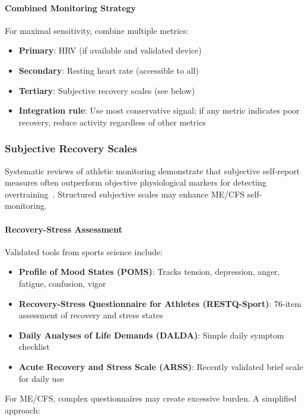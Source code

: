 \paragraph{Combined Monitoring Strategy}

For maximal sensitivity, combine multiple metrics:
\begin{itemize}
    \item \textbf{Primary}: HRV (if available and validated device)
    \item \textbf{Secondary}: Resting heart rate (accessible to all)
    \item \textbf{Tertiary}: Subjective recovery scales (see below)
    \item \textbf{Integration rule}: Use most conservative signal; if any metric indicates poor recovery, reduce activity regardless of other metrics
\end{itemize}

\subsubsection{Subjective Recovery Scales}

Systematic reviews of athletic monitoring demonstrate that subjective self-report measures often outperform objective physiological markers for detecting overtraining~\cite{Hooper2024subjective}. Structured subjective scales may enhance ME/CFS self-monitoring.

\paragraph{Recovery-Stress Assessment}

Validated tools from sports science include:
\begin{itemize}
    \item \textbf{Profile of Mood States (POMS)}: Tracks tension, depression, anger, fatigue, confusion, vigor
    \item \textbf{Recovery-Stress Questionnaire for Athletes (RESTQ-Sport)}: 76-item assessment of recovery and stress states
    \item \textbf{Daily Analyses of Life Demands (DALDA)}: Simple daily symptom checklist
    \item \textbf{Acute Recovery and Stress Scale (ARSS)}: Recently validated brief scale for daily use
\end{itemize}

For ME/CFS, complex questionnaires may create excessive burden. A simplified approach:

